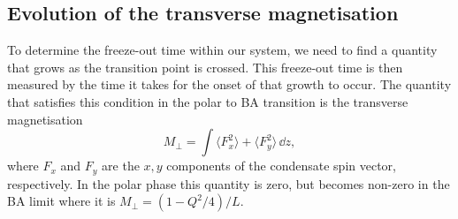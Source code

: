 \subsection{Evolution of the transverse magnetisation}
To determine the freeze-out time within our system, we need to find a quantity
that grows as the transition point is crossed.
This freeze-out time is then measured by the time it takes for the onset of
that growth to occur.
The quantity that satisfies this condition in the polar to BA transition is the
transverse magnetisation
\begin{equation}
    M_\perp = \int \langle F_x^2\rangle + \langle F_y^2\rangle \, \dd z,
\end{equation}
where \(F_x\) and \(F_y \) are the \(x, y\) components of the condensate spin
vector, respectively.
In the polar phase this quantity is zero, but becomes non-zero in the BA limit
where it is \(M_\perp = (1 - Q^2/4)/L\).
